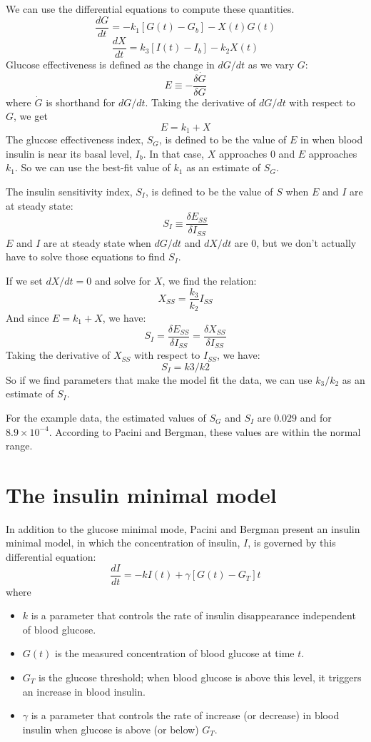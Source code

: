 \documentclass[12pt]{book}
\theoremstyle{exercise}
\begin{document}
We can use the differential equations to compute these quantities.
%
\[ \frac{dG}{dt} = -k_1 \left[ G(t) - G_b \right] - X(t) G(t) \]
%
\[ \frac{dX}{dt} = k_3 \left[I(t) - I_b \right] - k_2 X(t) \]
%
Glucose effectiveness is defined as the change in $dG/dt$ as we vary $G$:
%
\[ E \equiv - \frac{\delta \dot{G}}{\delta G} \]
%
where $\dot{G}$ is shorthand for $dG/dt$.  Taking the derivative of $dG/dt$ with respect to $G$, we get
%
\[ E = k_1 + X \]
%
The glucose effectiveness index, $S_G$, is defined to be the value of $E$ in when blood insulin is near its basal level, $I_b$.  In that case, $X$ approaches 0 and $E$ approaches $k_1$.  So we can use the best-fit value of $k_1$ as an estimate of $S_G$.

The insulin sensitivity index, $S_I$, is defined to be the value of $S$ when $E$ and $I$ are at steady state:
%
\[ S_I \equiv \frac{\delta E_{SS}}{\delta I_{SS}} \]
%
$E$ and $I$ are at steady state when $dG/dt$ and $dX/dt$ are 0, but we don't actually have to solve those equations to find $S_I$.

If we set $dX/dt = 0$ and solve for $X$, we find the relation:
%
\[ X_{SS} = \frac{k_3}{k_2} I_{SS} \]
%
And since $E = k_1 + X$, we have:  
%
\[ S_I = \frac{\delta E_{SS}}{\delta I_{SS}} = \frac{\delta X_{SS}}{\delta I_{SS}} \]
%
Taking the derivative of $X_{SS}$ with respect to $I_{SS}$, we have:
%
\[ S_I = k3 / k2 \]
%
So if we find parameters that make the model fit the data, we can use $k_3 / k_2$ as an estimate of $S_I$.  

For the example data, the estimated values of $S_G$ and $S_I$ are $0.029$ and for $8.9 \times 10^{-4}$.  According to Pacini and Bergman, these values are within the normal range.


\section{The insulin minimal model}

In addition to the glucose minimal mode, Pacini and Bergman present an insulin minimal model, in which the concentration of insulin, $I$, is governed by this differential equation:
%
\[ \frac{dI}{dt} = -k I(t) + \gamma \left[ G(t) - G_T \right] t \]
%
where

\begin{itemize}

\item $k$ is a parameter that controls the rate of insulin disappearance independent of blood glucose.   

\item $G(t)$ is the measured concentration of blood glucose at time $t$.

\item $G_T$ is the glucose threshold; when blood glucose is above this level, it triggers an increase in blood insulin. 

\item $\gamma$ is a parameter that controls the rate of increase (or decrease) in blood insulin when glucose is above (or below) $G_T$.


\end{itemize}
\end{document}
